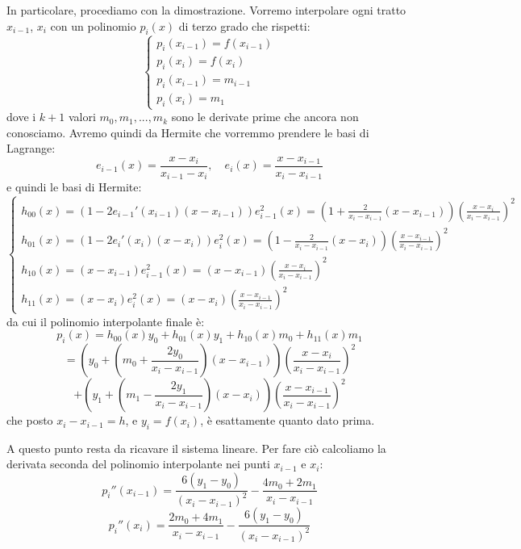 \documentclass[a4paper,11pt]{article}
\begin{document}
\begin{itemize}
	In particolare, procediamo con la dimostrazione.
	Vorremo interpolare ogni tratto $x_{i - 1}$, $x_i$ con un polinomio $p_i(x)$ di terzo grado che rispetti:
	\[
		\begin{cases}
			p_i(x_{i - 1}) = f(x_{i - 1}) \\
			p_i(x_i) = f(x_i) \\
			p_i(x_{i - 1}) = m_{i - 1} \\
			p_i(x_i) = m_1
		\end{cases}
	\]
	dove i $k + 1$ valori $m_0, m_1, ..., m_k$ sono le derivate prime che ancora non conosciamo.
	Avremo quindi da Hermite che vorremmo prendere le basi di Lagrange:
	$$
	e_{i-1}(x) = \frac{x - x_i}{x_{i-1} - x_i}, \quad e_i(x) = \frac{x - x_{i-1}}{x_i - x_{i-1}}
	$$
	e quindi le basi di Hermite:
	\[
		\begin{cases}
			h_{00}\left(x\right) = (1 - 2e_{i - 1}'(x_{i - 1})(x - x_{i-1}))e_{i-1}^2(x) = \left(1+\frac{2}{x_{i}-x_{i-1}}\left(x-x_{i-1}\right)\right)\left(\frac{x-x_{i}}{x_{i}-x_{i-1}}\right)^{2}	\\

			h_{01}\left(x\right) = (1 - 2e_{i}'(x_i)(x - x_i))e_i^2(x) =\left(1-\frac{2}{x_{i}-x_{i-1}}\left(x-x_{i}\right)\right)\left(\frac{x-x_{i-1}}{x_{i}-x_{i-1}}\right)^{2} \\

			h_{10}\left(x\right) = (x - x_{i - 1})e_{i-1}^2(x) = \left(x-x_{i-1}\right)\left(\frac{x-x_{i}}{x_{i}-x_{i-1}}\right)^{2} \\

			h_{11}\left(x\right) = (x - x_{i})e_{i}^2(x) = \left(x-x_{i}\right)\left(\frac{x-x_{i-1}}{x_{i}-x_{i-1}}\right)^{2}
		\end{cases}
	\]
	da cui il polinomio interpolante finale è:
	$$
	p_i\left(x\right)=h_{00}\left(x\right)y_{0}+h_{01}\left(x\right)y_{1}+h_{10}\left(x\right)m_{0}+h_{11}\left(x\right)m_{1}
	$$
	$$
	=\left(y_{0}+\left(m_{0}+\frac{2y_{0}}{x_{i}-x_{i-1}}\right)\left(x-x_{i-1}\right)\right)\left(\frac{x-x_{i}}{x_{i}-x_{i-1}}\right)^{2}
	$$
	$$
	+\left(y_{1}+\left(m_{1}-\frac{2y_{1}}{x_{i}-x_{i-1}}\right)\left(x-x_{i}\right)\right)\left(\frac{x-x_{i-1}}{x_{i}-x_{i-1}}\right)^{2}
	$$
	che posto $x_i - x_{i - 1} = h$, e $y_i = f(x_i)$, è esattamente quanto dato prima.
	
	A questo punto resta da ricavare il sistema lineare.
	Per fare ciò calcoliamo la derivata seconda del polinomio interpolante nei punti $x_{i - 1}$ e $x_i$:
	$$
	p_i''(x_{i - 1}) = \frac{6\left(y_{1}-y_{0}\right)}{\left(x_{i}-x_{i-1}\right)^{2}}-\frac{4m_{0}+2m_{1}}{x_{i}-x_{i-1}}
	$$
	$$
	p_i''(x_i) = \frac{2m_{0}+4m_{1}}{x_{i}-x_{i-1}}-\frac{6\left(y_{1}-y_{0}\right)}{\left(x_{i}-x_{i-1}\right)^{2}}
	$$


\end{itemize}
\end{document}
